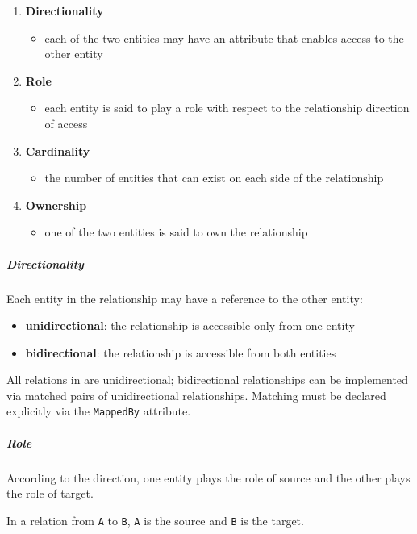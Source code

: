 \documentclass[english]{article}
\begin{document}
\begin{enumerate}
  \item \textbf{Directionality}
        \begin{itemize}[label=\(\rightarrow\)]
          \item each of the two entities may have an attribute that enables access to the other entity
        \end{itemize}
  \item \textbf{Role}
        \begin{itemize}[label=\(\rightarrow\)]
          \item each entity is said to play a role with respect to the relationship direction of access
        \end{itemize}
  \item \textbf{Cardinality}
        \begin{itemize}[label=\(\rightarrow\)]
          \item the number of entities that can exist on each side of the relationship
        \end{itemize}
  \item \textbf{Ownership}
        \begin{itemize}[label=\(\rightarrow\)]
          \item one of the two entities is said to own the relationship
        \end{itemize}
\end{enumerate}

\subparagraph*{Directionality}
Each entity in the relationship may have a reference to the other entity:

\begin{itemize}
  \item \textbf{unidirectional}: the relationship is accessible only from one entity
  \item \textbf{bidirectional}: the relationship is accessible from both entities
\end{itemize}

All relations in \jpa are unidirectional;
bidirectional relationships can be implemented via matched pairs of unidirectional relationships.
Matching must be declared explicitly via the \texttt{MappedBy} attribute.

\subparagraph*{Role}
According to the direction, one entity plays the role of source and the other plays the role of target.

In a relation from \texttt{A} to \texttt{B}, \texttt{A} is the source and \texttt{B} is the target.
\end{document}
